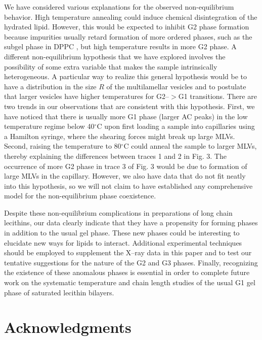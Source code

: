 We have considered various explanations for the observed non-equilibrium
behavior.  High temperature annealing could induce chemical 
disintegration of the hydrated lipid.  However, this would be 
expected to inhibit
G2 phase formation because impurities usually retard formation of more ordered
phases, such as the subgel phase in DPPC \cite{STN94}, but high
temperature results in more G2 phase.
A different non-equilibrium hypothesis that we have explored involves
the possibility of some extra variable that makes the sample 
intrinsically heterogeneous.  A particular way to realize this
general hypothesis would be to have a distribution in the size $R$ of
the multilamellar vesicles and to postulate that larger vesicles have higher 
temperatures for G2--$>$G1 transitions.  There are two trends in our
observations that are consistent with this hypothesis.
First, we have noticed that there is usually more G1 phase (larger AC peaks) 
in the low temperature regime below 40$^{\circ}$C
upon first loading a sample into capillaries using a Hamilton syringe, where 
the shearing forces might break up large MLVs.  Second, raising the
temperature to 80$^{\circ}$C could anneal the sample to larger MLVs,
thereby explaining the differences between traces 1 and 2 in Fig. 3.
The occurrence of more G2 phase in trace 3 of Fig. 3 would be due
to formation of large MLVs in the capillary.
However, we also have data that do not fit neatly into this hypothesis,
so we will not claim to have established any comprehensive model for the 
non-equilibrium phase coexistence.  

Despite these non-equilibrium complications in preparations of
long chain lecithins, our data clearly indicate that they have a propensity
for forming phases in addition to the usual gel phase.  These new
phases could be interesting to elucidate new ways for lipids to
interact.  Additional experimental techniques should be employed to 
supplement the
X--ray data in this paper and to test our tentative suggestions for the
nature of the G2 and G3 phases.  Finally, recognizing the existence of these
anomalous phases is essential in order to complete future work on the
systematic temperature and chain length studies of the usual G1 gel phase of 
saturated lecithin bilayers.

\section{Acknowledgments} 

